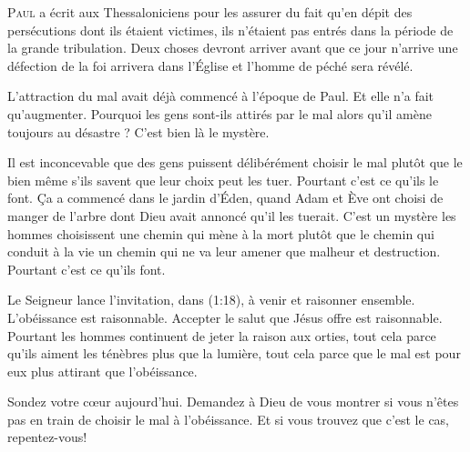 \jrnlmonth




\lettrine{P}{aul} a écrit aux Thessaloniciens pour les assurer du fait
 qu'en dépit des persécutions dont ils étaient victimes,
 ils n'étaient pas entrés dans la période de la grande tribulation.
 Deux choses devront arriver avant que ce jour n'arrive\frcolon{}
 une défection de la foi arrivera dans l'Église 
 et l'homme de péché sera révélé.

L'attraction du mal avait déjà commencé à l'époque de Paul.
 Et elle n'a fait qu'augmenter. Pourquoi 
 les gens sont-ils attirés
 par le mal alors qu'il amène toujours au désastre ?
 C'est bien là le mystère.


Il est inconcevable que des gens puissent délibérément choisir le mal
 plutôt que le bien \ocadr même s'ils savent que leur choix peut les tuer.
 Pourtant c'est ce qu'ils le font.
 Ça a commencé dans le jardin d'Éden, quand Adam et Ève ont choisi de manger
 de l'arbre dont Dieu avait annoncé qu'il les tuerait.
 C'est un mystère\frcolon{} les hommes choisissent une chemin qui mène à la mort
 plutôt que le chemin qui conduit à la vie
 \ocadr un chemin qui ne va leur amener que malheur et destruction.
 Pourtant c'est ce qu'ils font.

Le Seigneur lance l'invitation, dans (1:18),
 à \Og venir et raisonner ensemble. \Fg{} L'obéissance est raisonnable.
 Accepter le salut que Jésus offre est raisonnable.
 Pourtant les hommes continuent  de jeter la raison aux orties,
 tout cela parce qu'ils aiment les ténèbres plus que la lumière,
 tout cela parce que le mal est pour eux plus attirant que l'obéissance.

Sondez votre c\oe{}ur aujourd'hui. Demandez à Dieu de vous montrer
 si vous n'êtes pas en train de choisir le mal à l'obéissance.
 Et si vous trouvez que c'est le cas, repentez-vous!

\dvrule



